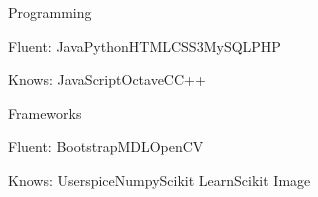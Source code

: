 \begin{cventries}
  \cventry
    {}
    {Programming}
    {}
    {}
    {
      \begin{cvitems}
        \item {Fluent: {\enskip\cdotp\enskip}Java{\enskip\cdotp\enskip}Python{\enskip\cdotp\enskip}HTML{\enskip\cdotp\enskip}CSS3{\enskip\cdotp\enskip}MySQL{\enskip\cdotp\enskip}PHP}
        \item {Knows: {\enskip\cdotp\enskip}JavaScript{\enskip\cdotp\enskip}Octave{\enskip\cdotp\enskip}C{\enskip\cdotp\enskip}C++}
      \end{cvitems}
    }
  \cventry
    {}
    {Frameworks}
    {}
    {}
    {
      \begin{cvitems}
        \item {Fluent: {\enskip\cdotp\enskip}Bootstrap{\enskip\cdotp\enskip}MDL{\enskip\cdotp\enskip}OpenCV }
        \item {Knows: {\enskip\cdotp\enskip}Userspice{\enskip\cdotp\enskip}Numpy{\enskip\cdotp\enskip}Scikit Learn{\enskip\cdotp\enskip}Scikit Image }
      \end{cvitems}
    }
\end{cventries}
